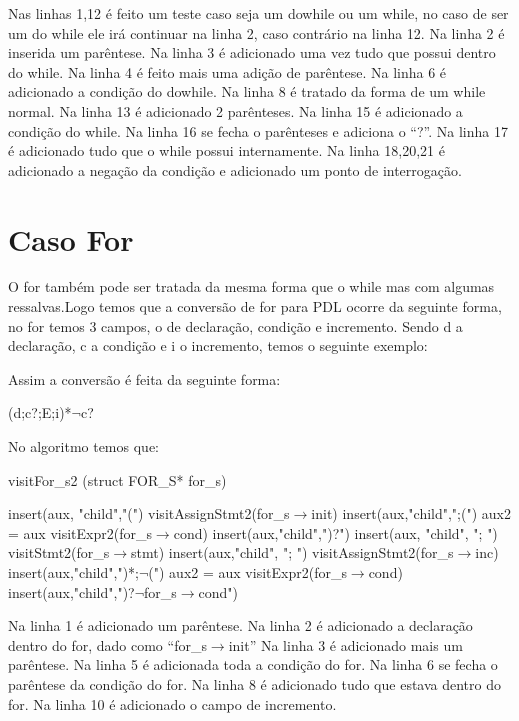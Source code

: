 \documentclass{article}
\begin{document}
		Nas linhas 1,12 é feito um teste caso seja um dowhile ou um while, no caso de ser um do while ele irá continuar na linha 2, caso contrário na linha 12.
		Na linha 2 é inserida um parêntese.
		Na linha 3 é adicionado uma vez tudo que possui dentro do while.
		Na linha 4 é feito mais uma adição de parêntese.
		Na linha 6 é adicionado a condição do dowhile.
		Na linha 8 é tratado da forma de um while normal.
		Na linha 13 é adicionado 2 parênteses.
		Na linha 15 é adicionado a condição do while.
		Na linha 16 se fecha o parênteses e adiciona o “?”.
		Na linha 17 é adicionado tudo que o while possui internamente.
		Na linha 18,20,21 é adicionado a negação da condição e adicionado um ponto de interrogação.
		
		\section{Caso For}
		
		O for também pode ser tratada da mesma forma que o while mas com algumas ressalvas.Logo temos que a conversão de for para PDL ocorre da seguinte forma, no for temos 3 campos, o de declaração, condição e incremento. Sendo d a declaração, c a condição e i o incremento, temos o seguinte exemplo:
		
		\begin{algorithm}
		\end{algorithm}
		
		Assim a conversão é feita da seguinte forma:
			
		(d;c?;E;i)*$\neg$c?
		
		No algoritmo temos que:
		
		\begin{algorithm}
			\caption{visitFor\_s2 (struct FOR\_S* for\_s)}
			insert(aux, "child","(")\;
			visitAssignStmt2(for\_s$\rightarrow$init)\;
			insert(aux,"child",";(")\;
			aux2 = aux\;
			visitExpr2(for\_s$\rightarrow$cond)\;
			insert(aux,"child",")?")\;
			insert(aux, "child", "; ")\;
			visitStmt2(for\_s$\rightarrow$stmt)\;
			insert(aux,"child", "; ")\;
			visitAssignStmt2(for\_s$\rightarrow$inc)\;
			insert(aux,"child",")*;$\neg$(")\;
			aux2 = aux\;
			visitExpr2(for\_s$\rightarrow$cond)\;
			insert(aux,"child",")?$\neg$for\_s$\rightarrow$cond")\;
		\end{algorithm}
	
		Na linha 1 é adicionado um parêntese.
		Na linha 2 é adicionado a declaração dentro do for, dado como “for\_s$\rightarrow$init”
		Na linha 3 é adicionado mais um parêntese.
		Na linha 5 é adicionada toda a condição do for.
		Na linha 6 se fecha o parêntese da condição do for.
		Na linha 8 é adicionado tudo que estava dentro do for.
		Na linha 10 é adicionado o campo de incremento.
		
\end{document}
